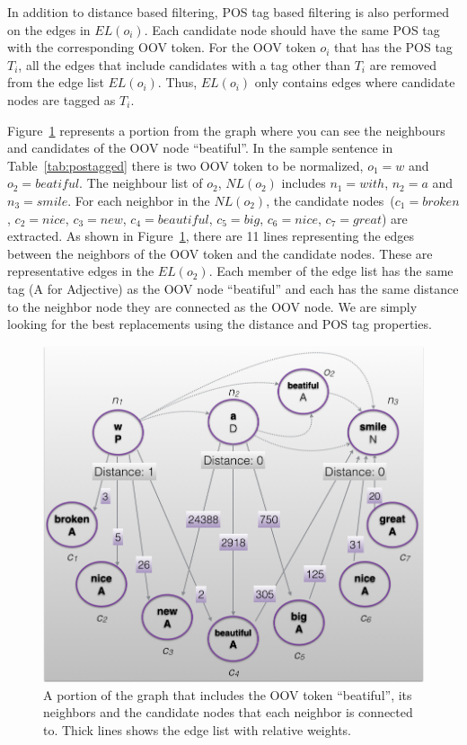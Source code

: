 \documentclass[a4paper,onesided,12pt]{report}
\begin{document}
In addition to distance based filtering, POS tag based filtering is also performed on the edges in $EL(o_i)$. Each candidate node should have the same POS tag with the corresponding OOV token. For the OOV token $o_i$ that has the POS tag $T_i$, all the edges that include candidates with a tag other than $T_i$ are removed from the edge list $EL(o_{i})$. Thus, $EL(o_{i})$ only contains edges where candidate nodes are tagged as $T_i$.

Figure~\ref{fig:edgeWeight} represents a portion from the graph where you can see the neighbours  and candidates of the OOV node ``beatiful''. In the sample sentence in Table~\ref{tab:postagged} there is two OOV token to be normalized, $o_1=w$ and $o_2=beatiful$. The neighbour list of $o_2$, $NL(o_2)$ includes  $n_1=with$, $n_2=a$ and $n_3=smile$. For each neighbor in the $NL(o_2)$, the candidate nodes~($c_1=broken$, $c_2=nice$, $c_3=new$, $c_4=beautiful$, $c_5=big$, $c_6=nice$, $c_7=great$) are extracted. As shown in Figure~\ref{fig:edgeWeight}, there are 11 lines representing the edges between the neighbors of the OOV token and the candidate nodes. These are representative edges in the $EL(o_2)$. Each member of the edge list has the same tag (A for Adjective) as the OOV node ``beatiful'' and each has the same distance to the neighbor node they are connected as the OOV node. We are simply looking for the best replacements using the distance and POS tag properties.

\begin{figure}[htb]
\begin{center}
\includegraphics[scale=0.5]{fig/edgeWeight}
\caption{A portion of the graph that includes the OOV token ``beatiful'', its neighbors and the candidate nodes that each neighbor is connected to. Thick lines shows the edge list with relative weights.}
\label{fig:edgeWeight}
\end{center}
\end{figure}
\end{document}
